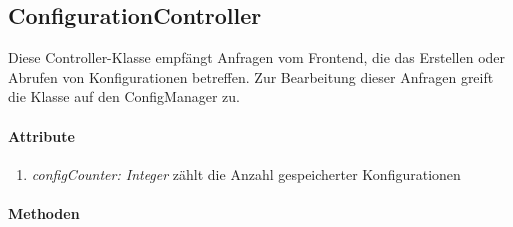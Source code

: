 \subsection{ConfigurationController}
Diese Controller-Klasse empfängt Anfragen vom Frontend, die das Erstellen oder Abrufen von Konfigurationen betreffen. Zur Bearbeitung dieser Anfragen greift die Klasse auf den ConfigManager zu.


\paragraph{Attribute}
\begin{enumerate}[$\bullet$]
	\item \textit{configCounter: Integer} zählt die Anzahl gespeicherter Konfigurationen
\end{enumerate}

\paragraph{Methoden}

